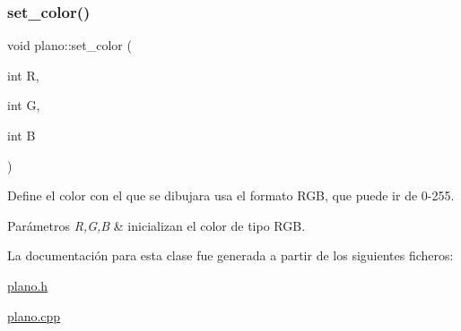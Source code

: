 \subsubsection{\texorpdfstring{set\+\_\+color()}{set\_color()}}
{\footnotesize\ttfamily void plano\+::set\+\_\+color (\begin{DoxyParamCaption}\item[{int}]{R,  }\item[{int}]{G,  }\item[{int}]{B }\end{DoxyParamCaption})}

Define el color con el que se dibujara usa el formato R\+GB, que puede ir de 0-\/255. 
\begin{DoxyParams}{Parámetros}
{\em R,G,B} & inicializan el color de tipo R\+GB. \\
\hline
\end{DoxyParams}


La documentación para esta clase fue generada a partir de los siguientes ficheros\+:\begin{DoxyCompactItemize}
\item 
\hyperlink{plano_8h}{plano.\+h}\item 
\hyperlink{plano_8cpp}{plano.\+cpp}\end{DoxyCompactItemize}
